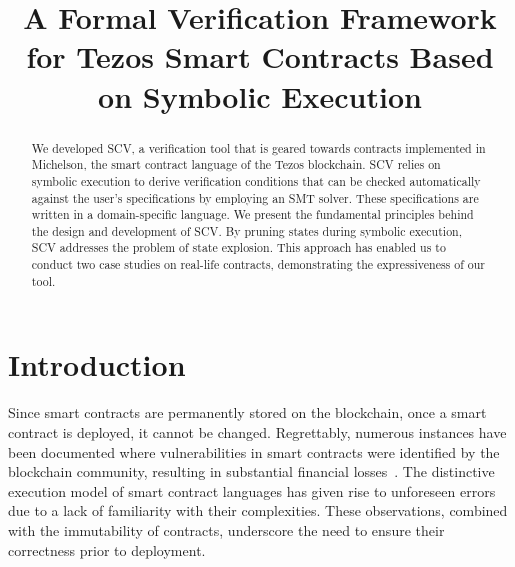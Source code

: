 \documentclass[runningheads]{llncs}
\begin{document}
%
\title{A Formal Verification Framework for Tezos Smart Contracts Based on Symbolic Execution}
%
%


%
%
%
\maketitle              %
%
\begin{abstract}
We developed SCV, a verification tool that is geared towards contracts implemented in Michelson, the smart contract language of the Tezos blockchain. SCV relies on symbolic execution to derive verification conditions that can be checked automatically against the user's specifications by employing an SMT solver. These specifications are written in a domain-specific language. We present the fundamental principles behind the design and development of SCV. By pruning states during symbolic execution, SCV addresses the problem of state explosion. This approach has enabled us to conduct two case studies on real-life contracts, demonstrating the expressiveness of our tool.
\end{abstract}
\section{Introduction}
\label{sec:introduction}
Since smart contracts are permanently stored on the blockchain, once a smart contract is deployed, it cannot be changed. Regrettably, numerous instances have been documented where vulnerabilities in smart contracts were identified by the blockchain community, resulting in substantial financial losses~\cite{dao,wallethack}. The distinctive execution model of smart contract languages has given rise to unforeseen errors due to a lack of familiarity with their complexities. These observations, combined with the immutability of contracts, underscore the need to ensure their correctness prior to deployment.
\end{document}
